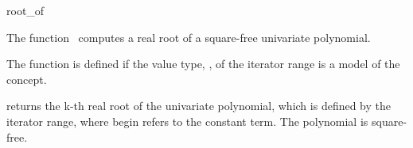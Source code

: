 \begin{ccRefFunction}{root_of}

\ccDefinition

The function \ccRefName\ computes a real root of a square-free univariate 
polynomial.

The function is defined if the value type, ,
of the iterator range is a model of the  concept. 


        {
        returns the k-th real root of the univariate polynomial, 
        which is defined by the iterator range, 
        where begin refers to the constant term. 
        \ccPrecond The polynomial is square-free. 
        }


\ccSeeAlso

\\
\\


\end{ccRefFunction}
